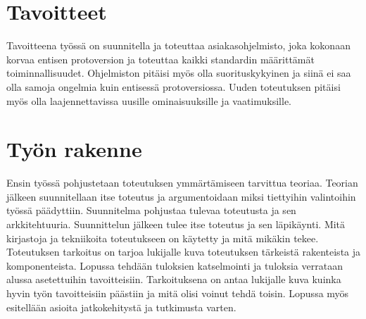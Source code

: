 \section{Tavoitteet}

Tavoitteena työssä on suunnitella ja toteuttaa asiakasohjelmisto, joka kokonaan korvaa entisen protoversion ja toteuttaa kaikki standardin määrittämät toiminnallisuudet. Ohjelmiston pitäisi myös olla suorituskykyinen ja siinä ei saa olla samoja ongelmia kuin entisessä protoversiossa. Uuden toteutuksen pitäisi myös olla laajennettavissa uusille ominaisuuksille ja vaatimuksille.

\section{Työn rakenne}

Ensin työssä pohjustetaan toteutuksen ymmärtämiseen tarvittua teoriaa. Teorian jälkeen suunnitellaan itse toteutus ja argumentoidaan miksi tiettyihin valintoihin työssä päädyttiin. Suunnitelma pohjustaa tulevaa toteutusta ja sen arkkitehtuuria. Suunnittelun jälkeen tulee itse toteutus ja sen läpikäynti. Mitä kirjastoja ja tekniikoita toteutukseen on käytetty ja mitä mikäkin tekee. Toteutuksen tarkoitus on tarjoa lukijalle kuva toteutuksen tärkeistä rakenteista ja komponenteista. Lopussa tehdään tuloksien katselmointi ja tuloksia verrataan alussa asetettuihin tavoitteisiin. Tarkoituksena on antaa lukijalle kuva kuinka hyvin työn tavoitteisiin päästiin ja mitä olisi voinut tehdä toisin. Lopussa myös esitellään asioita jatkokehitystä ja tutkimusta varten.